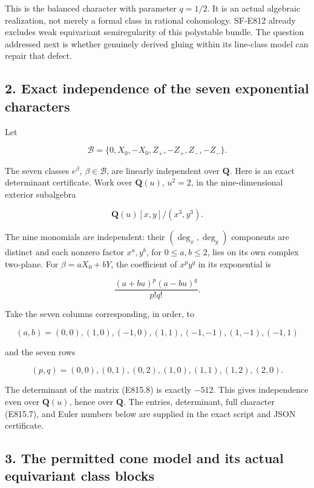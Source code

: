 This is the balanced character with parameter \(q=1/2\). It is an actual
algebraic realization, not merely a formal class in rational cohomology.
SF-E812 already excludes weak equivariant semiregularity of this
polystable bundle. The question addressed next is whether genuinely
derived gluing within its line-class model can repair that defect.

\subsection{2. Exact independence of the seven exponential
characters}\label{SF-E815-exact-independence-of-the-seven-exponential-characters}

Let

\[
 \mathcal B=\{0,X_0,-X_0,Z_+,-Z_+,Z_-,-Z_-\}.
\]

The seven classes \(e^\beta\), \(\beta\in\mathcal B\), are linearly
independent over \(\mathbf Q\). Here is an exact determinant
certificate. Work over \(\mathbf Q(u)\), \(u^2=2\), in the
nine-dimensional exterior subalgebra

\[
 \mathbf Q(u)[x,y]/(x^3,y^3).
\]

The nine monomials are independent: their \((\deg_x,\deg_y)\) components
are distinct and each nonzero factor \(x^a,y^b\), for \(0\le a,b\le2\),
lies on its own complex two-plane. For \(\beta=aX_0+bY\), the
coefficient of \(x^py^q\) in its exponential is

\[
 \frac{(a+bu)^p(a-bu)^q}{p!q!}.
 \tag{E815.8}
\]

Take the seven columns corresponding, in order, to

\[
 (a,b)=(0,0),(1,0),(-1,0),(1,1),(-1,-1),(1,-1),(-1,1)
\]

and the seven rows

\[
 (p,q)=(0,0),(0,1),(0,2),(1,0),(1,1),(1,2),(2,0).
\]

The determinant of the matrix (E815.8) is exactly \(-512\). This gives
independence even over \(\mathbf Q(u)\), hence over \(\mathbf Q\). The
entries, determinant, full character (E815.7), and Euler numbers below
are supplied in the exact script and JSON certificate.

\subsection{3. The permitted cone model and its actual equivariant class
blocks}\label{SF-E815-the-permitted-cone-model-and-its-actual-equivariant-class-blocks}

